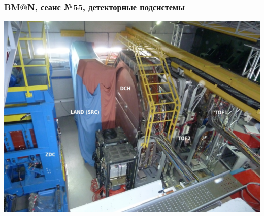 \documentclass[dvipsnames] {beamer}
\begin{document}
\begin{frame}
  \bf
  \frametitle{\bf \centering BM@N, сеанс №55, детекторные подсистемы}
  \begin{minipage}{1.\linewidth}
    \includegraphics[width=1.\linewidth]{detectors_behind_magnet.jpg}
  \end{minipage}
\end{frame}
\end{document}
